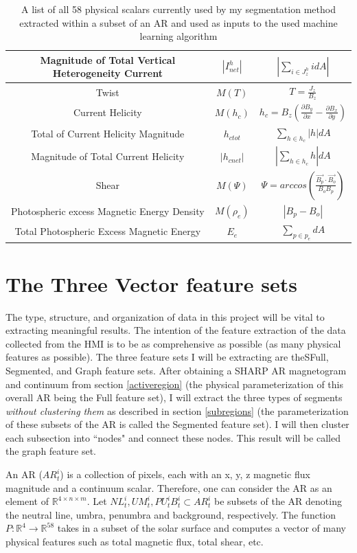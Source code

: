 \begin{table}[p!]
\begin{tabular}{||c c c||}
 \hline
 Magnitude of Total Vertical Heterogeneity Current & $|I_{net}^h|$ & $|\sum_{i \in J_z^h}idA|$ \\
 \hline
 Twist & $M(T)$ & $T = \frac{J_z}{B_z}$ \\
 \hline
 Current Helicity & $M(h_c)$ & $h_c = B_z(\frac{\partial B_y}{\partial x} - \frac{\partial B_x}{\partial y})$ \\
 \hline
 Total of Current Helicity Magnitude & $h_{c tot}$ & $\sum_{h \in h_c}|h|dA$ \\
 \hline
 Magnitude of Total Current Helicity & $|h_{c net}|$ & $|\sum_{h \in h_c}h|dA$ \\
 \hline
 Shear & $M(\Psi)$ & $\Psi = arccos(\frac{\vec{B_p} \cdot \vec{B_o}}{B_oB_p})$ \\
 \hline
 Photospheric excess Magnetic Energy Density & $M(\rho_e)$ & $|B_p - B_o|$ \\
 \hline
 Total Photospheric Excess Magnetic Energy & $E_e$ & $\sum_{p \in p_e}dA$ \\
 \hline
 \end{tabular}
 \caption{A list of all 58 physical scalars currently used by my segmentation method extracted within a subset of an AR and used as inputs to the used machine learning algorithm}
 \label{fig:parameters}
\end{table}

\section{The Three Vector feature sets}
The type, structure, and organization of data in this project will be vital to extracting meaningful results. The intention of the feature extraction of the data collected from the HMI is to be as comprehensive as possible (as many physical features as possible). The three feature sets I will be extracting are theSFull, Segmented, and Graph feature sets. After obtaining a SHARP AR magnetogram and continuum from section \ref{activeregion} (the physical parameterization of this overall AR being the Full feature set), I will extract the three types of segments \textit{without clustering them} as described in section \ref{subregions} (the parameterization of these subsets of the AR is called the Segmented feature set). I will then cluster each subsection into ``nodes" and connect these nodes. This result will be called the graph feature set.

An AR ($AR_t^i$) is a collection of pixels, each with an x, y, z magnetic flux magnitude and a continuum scalar. Therefore, one can consider the AR as an element of $\mathbb{R}^{4 \times n\times m}$. Let $NL_t^i, UM_t^i, PU_t^i B_t^i\subset AR_t^i$ be subsets of the AR denoting the neutral line, umbra, penumbra and background, respectively. The function $P : \mathbb{R}^{4} \rightarrow \mathbb{R}^{58}$ takes in a subset of the solar surface and computes a vector of many physical features such as total magnetic flux, total shear, etc. 

